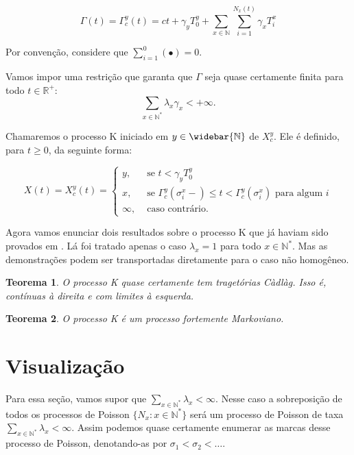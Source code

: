 \documentclass[11pt,twoside,a4paper]{article}
\newcommand{\N}{{\mathbb{N}}}
\newcommand{\Nb}{{\widebar{\N}}}
\newcommand{\Nz}{{\mathbb{N^*}}}
\newcommand{\R}{{\mathbb{R}}}
\newtheorem{teorema}{Teorema}[section]
\begin{document}
\begin{equation}
  \label{def:Gamma}
  \Gamma(t) = \Gamma^y_c (t) =
  ct +
  \gamma_y T_0^y +
  \sum_{x \in \N} \sum_{i = 1}^{N_x(t)}
  \gamma_x T_i^x
\end{equation}

Por convenção, considere que $\sum_{i=1}^{0}( \bullet ) = 0$.

Vamos impor uma restrição que garanta que $\Gamma$ seja quase
certamente finita para todo $t \in \R^+$:
\begin{equation}
  \sum_{x \in \Nz} \lambda_x\gamma_x < +\infty.
\end{equation}

Chamaremos o processo K iniciado em $y \in \Nb$ de $X^y_c$. Ele é
definido, para $t \geq 0$, da seguinte forma:

\begin{equation}
  \label{def:procK}
  X(t) = X^y_c (t) =
  \begin{cases}
    y, & \textrm{ se }  t < \gamma_y T_0^y\\
    x, & \textrm{ se } \Gamma^y_c(\sigma_i^x-) \leq t <
    \Gamma^y_c(\sigma^x_i)
    \textrm{ para algum } i \\
    \infty, & \textrm{ caso contrário.}
  \end{cases}
\end{equation}

Agora vamos enunciar dois resultados sobre o processo K que já haviam
sido provados em \cite{fontes:08}. Lá foi tratado apenas o caso
$\lambda_x = 1$ para todo $x \in \Nz$. Mas as demonstrações podem ser
transportadas diretamente para o caso não homogêneo.

\begin{teorema}
  O processo K quase certamente tem tragetórias Càdlàg. Isso é,
  contínuas à direita e com limites à esquerda.
\end{teorema}

\begin{teorema}
  O processo K é um processo fortemente Markoviano.
\end{teorema}



\section{Visualização}
\label{sec:visualizacao}

Para essa seção, vamos supor que $\sum_{x \in \Nz} \lambda_x <
\infty$. Nesse caso a sobreposição de todos os processos de Poisson
$\{N_x : x \in \Nz\}$ será um processo de Poisson de taxa $\sum_{x \in
  \Nz} \lambda_x < \infty$. Assim podemos quase certamente enumerar as
marcas desse processo de Poisson, denotando-as por $ \sigma_1 < \sigma_2 <
\ldots$.
\end{document}
